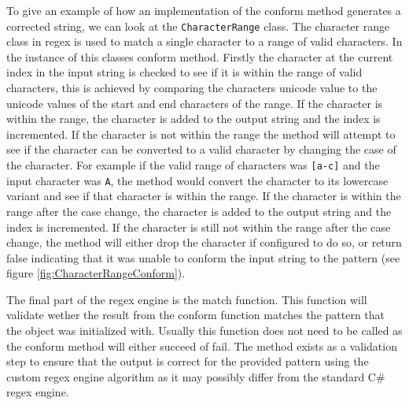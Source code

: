 To give an example of how an implementation of the conform method generates a corrected string, we can look at the \texttt{CharacterRange} class. The character range class in regex is used to match a single character to a range of valid characters. In the instance of this classes conform method. Firstly the character at the current index in the input string is checked to see if it is within the range of valid characters, this is achieved by comparing the characters unicode value to the unicode values of the start and end characters of the range. If the character is within the range, the character is added to the output string and the index is incremented. If the character is not within the range the method will attempt to see if the character can be converted to a valid character by changing the case of the character. For example if the valid range of characters was \texttt{[a-c]} and the input character was \texttt{A}, the method would convert the character to its lowercase variant and see if that character is within the range. If the character is within the range after the case change, the character is added to the output string and the index is incremented. If the character is still not within the range after the case change, the method will either drop the character if configured to do so, or return false indicating that it was unable to conform the input string to the pattern (see figure \ref{fig:CharacterRangeConform}).

The final part of the regex engine is the match function. This function will validate wether the result from the conform function matches the pattern that the object was initialized with. Usually this function does not need to be called as the conform method will either succeed of fail. The method exists as a validation step to ensure that the output is correct for the provided pattern using the custom regex engine algorithm as it may possibly differ from the standard C\# regex engine.
